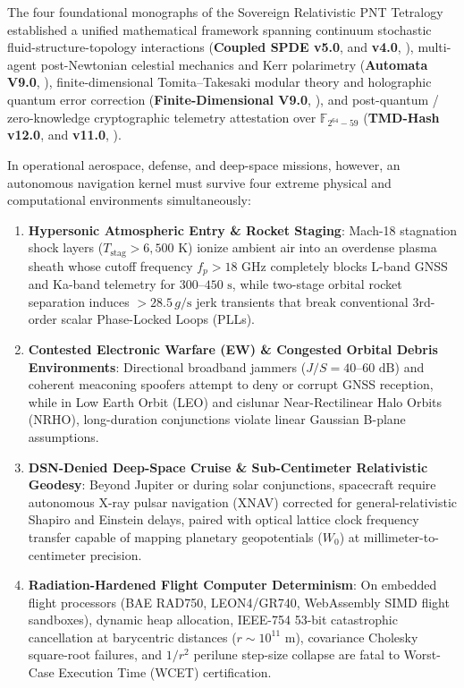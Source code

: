 \documentclass[11pt,a4paper]{article}
\theoremstyle{plain}
\theoremstyle{definition}
\theoremstyle{remark}
\begin{document}
The four foundational monographs of the Sovereign Relativistic PNT Tetralogy established a unified mathematical framework spanning continuum stochastic fluid-structure-topology interactions (\textbf{Coupled SPDE v5.0}, \cite{UnmaniSPDEV50} and \textbf{v4.0}, \cite{UnmaniSPDEV40}), multi-agent post-Newtonian celestial mechanics and Kerr polarimetry (\textbf{Automata V9.0}, \cite{UnmaniAutomataV90}), finite-dimensional Tomita--Takesaki modular theory and holographic quantum error correction (\textbf{Finite-Dimensional V9.0}, \cite{UnmaniFiniteV90}), and post-quantum / zero-knowledge cryptographic telemetry attestation over $\mathbb{F}_{2^{64}-59}$ (\textbf{TMD-Hash v12.0}, \cite{UnmaniTMD12} and \textbf{v11.0}, \cite{UnmaniTMD11}).

In operational aerospace, defense, and deep-space missions, however, an autonomous navigation kernel must survive four extreme physical and computational environments simultaneously:
\begin{enumerate}[leftmargin=1.8em,itemsep=2pt]
  \item \textbf{Hypersonic Atmospheric Entry \& Rocket Staging}: Mach-18 stagnation shock layers ($T_{\text{stag}} > 6,500\text{ K}$) ionize ambient air into an overdense plasma sheath whose cutoff frequency $f_p > 18\text{ GHz}$ completely blocks L-band GNSS and Ka-band telemetry for $300\text{--}450\text{ s}$, while two-stage orbital rocket separation induces $> 28.5\,g/\text{s}$ jerk transients that break conventional 3rd-order scalar Phase-Locked Loops (PLLs).
  \item \textbf{Contested Electronic Warfare (EW) \& Congested Orbital Debris Environments}: Directional broadband jammers ($J/S = 40\text{--}60\text{ dB}$) and coherent meaconing spoofers attempt to deny or corrupt GNSS reception, while in Low Earth Orbit (LEO) and cislunar Near-Rectilinear Halo Orbits (NRHO), long-duration conjunctions violate linear Gaussian B-plane assumptions.
  \item \textbf{DSN-Denied Deep-Space Cruise \& Sub-Centimeter Relativistic Geodesy}: Beyond Jupiter or during solar conjunctions, spacecraft require autonomous X-ray pulsar navigation (XNAV) corrected for general-relativistic Shapiro and Einstein delays, paired with optical lattice clock frequency transfer capable of mapping planetary geopotentials ($W_0$) at millimeter-to-centimeter precision.
  \item \textbf{Radiation-Hardened Flight Computer Determinism}: On embedded flight processors (BAE RAD750, LEON4/GR740, WebAssembly SIMD flight sandboxes), dynamic heap allocation, IEEE-754 53-bit catastrophic cancellation at barycentric distances ($r \sim 10^{11}\text{ m}$), covariance Cholesky square-root failures, and $1/r^2$ perilune step-size collapse are fatal to Worst-Case Execution Time (WCET) certification.
\end{enumerate}
\end{document}

